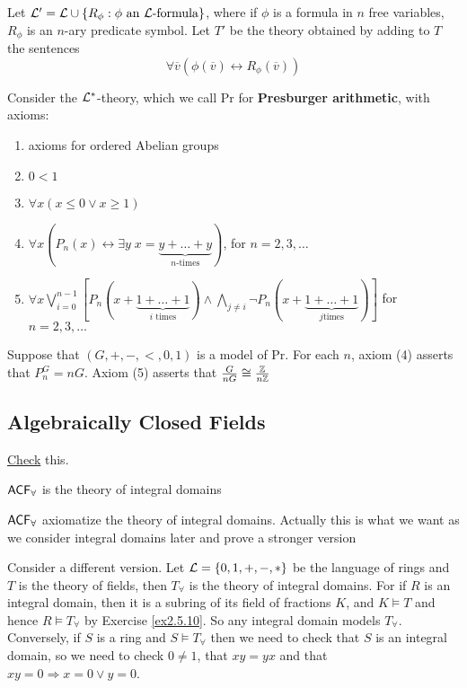 \documentclass[11pt]{article}
\begin{document}
Let \(\mathcal{L}'=\mathcal{L}\cup\{R_\phi:\phi\text{ an $\mathcal{L}$-formula}\}\), where if
\(\phi\) is a formula in \(n\) free variables, \(R_\phi\) is an \(n\)-ary
predicate symbol. Let \(T'\) be the theory obtained by adding to \(T\) the
sentences
\begin{equation*}
\forall\overbar{v}(\phi(\overbar{v})\leftrightarrow R_\phi(\overbar{v}))
\end{equation*}

Consider the \(\mathcal{L}^*\)-theory, which we call Pr for \textbf{Presburger
arithmetic}, with axioms:
\begin{enumerate}
\item axioms for ordered Abelian groups
\item \(0<1\)
\item \(\forall x(x\le0\vee x\ge1)\)
\item \(\forall x(P_n(x)\leftrightarrow\exists y\;x=\underbrace{y+\dots+y}_{n\text{-times}})\), for \(n=2,3,\dots\)
\item \(\forall x\bigvee_{i=0}^{n-1}[P_n(x+\underbrace{1+\dots+1}_{i\text{ times}})\wedge\bigwedge_{j\neq i}\neg P_n(x+\underbrace{1+\dots+1}_{j\text{times}})]\)
for \(n=2,3,\dots\)
\end{enumerate}


Suppose that \((G,+,-,<,0,1)\) is a model of Pr. For each \(n\), axiom (4)
asserts that \(P_n^G=nG\). Axiom (5) asserts that
\(\frac{G}{nG}\cong \frac{\mathbb{Z}}{n\mathbb{Z}}\)


\subsection{Algebraically Closed Fields}
\label{sec:orge0ec68e}
\begin{lemma}[]
\href{https://math.stackexchange.com/questions/1612597/acf-universal-is-the-theory-of-integral-domains}{Check} this.

\(\textsf{ACF}_\forall\) is the theory of integral domains

\(\textsf{ACF}_\forall\) axiomatize the theory of integral domains. Actually this is what we want as we
consider integral domains later and prove a stronger version
\end{lemma}

Consider a different version. Let \(\mathcal{L}=\{0,1,+,-,*\}\) be the language of rings and \(T\) is the
theory of fields, then \(T_\forall\) is the theory of integral domains. For if \(R\) is an integral
domain, then it is a subring of its field of fractions \(K\), and \(K\vDash T\) and hence \(R\vDash T_\forall\)
by Exercise \ref{ex2.5.10}. So any integral domain models \(T_\forall\). Conversely, if \(S\) is a ring
and \(S\vDash T_\forall\) then we need to check that \(S\) is an integral domain, so we need to
check \(0\neq 1\), that \(xy=yx\) and that \(xy=0\Rightarrow x=0\vee y=0\).
\end{document}
